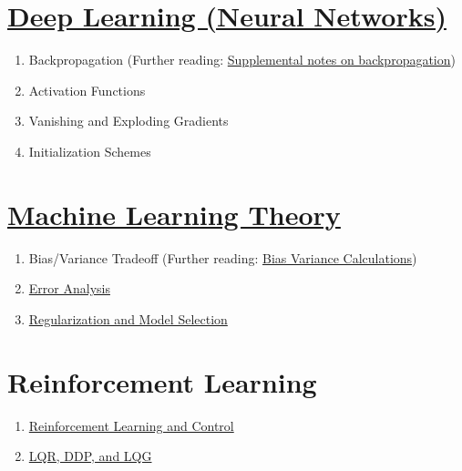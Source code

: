 \documentclass{article}
\begin{document}
\section{\href{https://github.com/scpd-proed/XCS229-Handouts/blob/main/Deep\%20Learning.pdf}{Deep Learning (Neural Networks)}}
\vspace{-2.5mm}
\begin{enumerate}
  \setlength\itemsep{-0.25em}
  \item Backpropagation (Further reading: \href{https://github.com/scpd-proed/XCS229-Handouts/blob/main/Backpropagation.pdf}{Supplemental notes on backpropagation})
  \item Activation Functions
  \item Vanishing and Exploding Gradients
  \item Initialization Schemes
\end{enumerate}
\vspace{-2.5mm}
\section{\href{https://github.com/scpd-proed/XCS229-Handouts/blob/main/Learning\%20Theory.pdf}{Machine Learning Theory}}
\vspace{-2.5mm}
\begin{enumerate}
  \setlength\itemsep{-0.25em}
  \item Bias/Variance Tradeoff (Further reading: \href{https://github.com/scpd-proed/XCS229-Handouts/blob/main/Bias-Variance.pdf}{Bias Variance Calculations})
  \item \href{https://github.com/scpd-proed/XCS229-Handouts/blob/main/Error\%20Analysis.pdf}{Error Analysis}
  \item \href{https://github.com/scpd-proed/XCS229-Handouts/blob/main/Regularization\%20and\%20Model\%20Selection.pdf}{Regularization and Model Selection}
\end{enumerate}
\vspace{-2.5mm}
\section{Reinforcement Learning}
\vspace{-2.5mm}
\begin{enumerate}
  \setlength\itemsep{-0.25em}
  \item \href{https://github.com/scpd-proed/XCS229-Handouts/blob/main/Reinforcement\%20Learning\%20and\%20Control.pdf}{Reinforcement Learning and Control}
  \item \href{https://github.com/scpd-proed/XCS229-Handouts/blob/main/LQR\%2C\%20DDP\%2C\%20and\%20LQG.pdf}{LQR, DDP, and LQG}
\end{enumerate}
\end{document}
